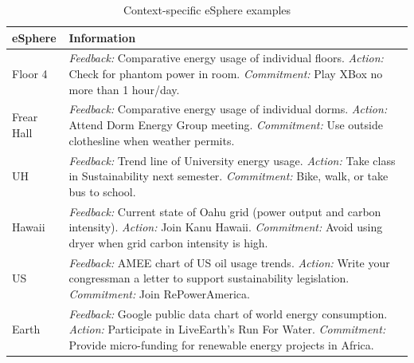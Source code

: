 \begin{table}[ht]
\centering
\small
 \begin{tabular}{|p{.60in}|p{5.5in}|}
  \hline
  {\bf eSphere} & {\bf Information} \\ \hline
Floor 4 & 
{\em Feedback:} Comparative energy usage of individual floors. \newline
{\em Action:} Check for phantom power in room. \newline
{\em Commitment:} Play XBox no more than 1 hour/day.
\\ \hline

Frear Hall & 
{\em Feedback:} Comparative energy usage of individual dorms. \newline
{\em Action:} Attend Dorm Energy Group meeting. \newline
{\em Commitment:} Use outside clothesline when weather permits.
\\ \hline

UH & 
{\em Feedback:} Trend line of University energy usage.\newline
{\em Action:} Take class in Sustainability next semester. \newline
{\em Commitment:} Bike, walk, or take bus to school.
\\ \hline

Hawaii & 
{\em Feedback:} Current state of Oahu grid (power output and carbon intensity). \newline
{\em Action:} Join Kanu Hawaii. \newline
{\em Commitment:} Avoid using dryer when grid carbon intensity is high.
\\ \hline

US & 
{\em Feedback:} AMEE chart of US oil usage trends. \newline
{\em Action:} Write your congressman a letter to support sustainability legislation. \newline
{\em Commitment:} Join RePowerAmerica.
\\ \hline

Earth & 
{\em Feedback:} Google public data chart of world energy consumption. \newline
{\em Action:} Participate in LiveEarth's Run For Water. \newline
{\em Commitment:}  Provide micro-funding for renewable energy projects in Africa.  
\\ \hline

\end{tabular}
\caption{Context-specific eSphere examples}
\label{table:esphere-examples} 
\end{table}


